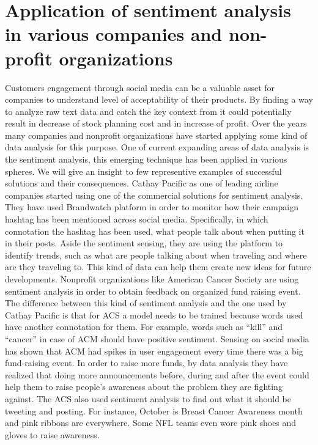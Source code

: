 \section{Application of sentiment analysis in various companies and non-profit organizations}
Customers engagement through social media can be a valuable asset for companies to understand level of acceptability of their products. By finding a way to analyze raw text data and catch the key context from it could potentially result in decrease of stock planning cost and in increase of profit.
Over the years many companies and nonprofit organizations have started applying some kind of data analysis for this purpose. One of current expanding areas of data analysis is the sentiment analysis, this emerging technique has been applied in various spheres. We will give an insight to few representive examples of successful solutions and their consequences.
Cathay Pacific as one of leading airline companies started using one of the commercial solutions for sentiment analysis. They have used Brandwatch platform in order to monitor how their campaign hashtag has been mentioned across social media. Specifically, in which connotation the hashtag has been used, what people talk about when putting it in their posts. Aside the sentiment sensing, they are using the platform to identify trends, such as what are people talking about when traveling and where are they traveling to. This kind of data can help them create new ideas for future developments.
Nonprofit organizations like American Cancer Society are using sentiment analysis in order to obtain feedback on organized fund raising event. The difference between this kind of sentiment analysis and the one used by Cathay Pacific is that for ACS a model needs to be trained because words used have another connotation for them. For example, words such as “kill” and “cancer” in case of ACM should have positive sentiment. Sensing on social media has shown that ACM had spikes in user engagement every time there was a big fund-raising event. In order to raise more funds, by data analysis they have realized that doing more announcements before, during and after the event could help them to raise people’s awareness about the problem they are fighting against. The ACS also used sentiment analysis to find out what it should be tweeting and posting. For instance, October is Breast Cancer Awareness month and pink ribbons are everywhere. Some NFL teams even wore pink shoes and gloves to raise awareness.\\

